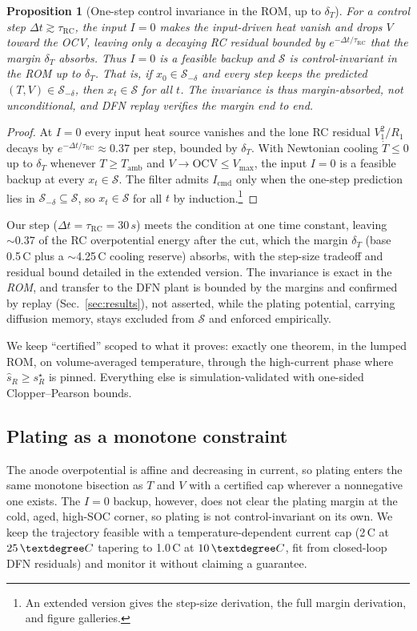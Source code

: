 \documentclass[conference]{IEEEtran}
\newtheorem{proposition}{Proposition}
\newcommand{\SI}[2]{#1\,#2}
\newcommand{\degreeCelsius}{\textdegree C}
\begin{document}
\begin{proposition}[One-step control invariance in the ROM, up to $\delta_T$]\label{prop:inv}
For a control step $\Delta t\gtrsim\tau_\mathrm{RC}$, the input $I=0$ makes the input-driven heat
vanish and drops $V$ toward the OCV, leaving only a decaying RC residual bounded by
$e^{-\Delta t/\tau_\mathrm{RC}}$ that the margin $\delta_T$ absorbs. Thus $I=0$ is a feasible backup
and $\mathcal S$ is control-invariant in the ROM \emph{up to} $\delta_T$. That is, if
$x_0\in\mathcal S_{-\delta}$ and every step keeps the predicted $(T,V)\in\mathcal S_{-\delta}$, then
$x_t\in\mathcal S$ for all $t$. The invariance is thus margin-absorbed, not unconditional, and DFN
replay verifies the margin end to end.
\end{proposition}
\begin{proof}
At $I=0$ every input heat source vanishes and the lone RC residual $V_1^2/R_1$ decays by
$e^{-\Delta t/\tau_\mathrm{RC}}{\approx}0.37$ per step, bounded by $\delta_T$. With Newtonian cooling
$\dot T\le0$ up to $\delta_T$ whenever $T\ge T_\mathrm{amb}$ and $V\to\mathrm{OCV}\le V_{\max}$, the
input $I=0$ is a feasible backup at every $x_t\in\mathcal S$. The filter admits $I_\mathrm{cmd}$ only
when the one-step prediction lies in $\mathcal S_{-\delta}\subseteq\mathcal S$, so
$x_t\in\mathcal S$ for all $t$ by induction.\footnote{An extended version gives the step-size
derivation, the full margin derivation, and figure galleries.}
\end{proof}

Our step ($\Delta t=\tau_\mathrm{RC}=\SI{30}{s}$) meets the condition at one time constant, leaving
$\sim0.37$ of the RC overpotential energy after the cut, which the margin $\delta_T$ (base
\SI{0.5}{\degreeCelsius} plus a $\sim$\SI{4.25}{\degreeCelsius} cooling reserve) absorbs, with the
step-size tradeoff and residual bound detailed in the extended version. The invariance is exact in the
\emph{ROM}, and transfer to the DFN plant is bounded by the margins and confirmed by replay
(Sec.~\ref{sec:results}), not asserted, while the plating potential, carrying diffusion
memory, stays excluded from $\mathcal S$ and enforced empirically.

We keep ``certified'' scoped to what it proves: exactly one theorem, in the lumped ROM, on
volume-averaged temperature, through the high-current phase where $\hat s_R\ge s_R^\star$ is pinned.
Everything else is simulation-validated with one-sided Clopper--Pearson bounds.

\subsection{Plating as a monotone constraint}
The anode overpotential is affine and decreasing in current, so plating enters the same monotone
bisection as $T$ and $V$ with a certified cap wherever a nonnegative one exists. The $I{=}0$ backup,
however, does not clear the plating margin at the cold, aged, high-SOC corner, so plating is not
control-invariant on its own. We keep the trajectory feasible with a temperature-dependent current cap
(\SI{2}{C} at $\SI{25}{\degreeCelsius}$ tapering to \SI{1.0}{C} at $\SI{10}{\degreeCelsius}$, fit from
closed-loop DFN residuals) and monitor it without claiming a guarantee.
\end{document}
